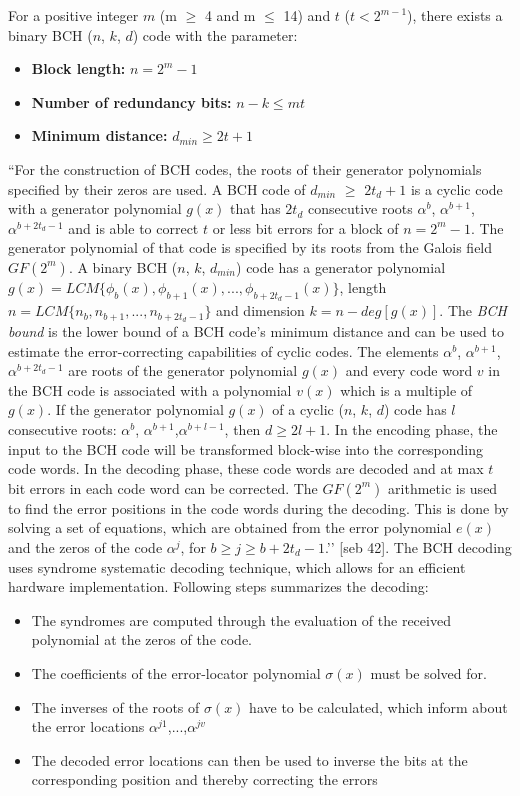 For a positive integer $m$ (m $\geq$ 4 and m $\leq$ 14) and $t$ ($t < 2^{m-1}$), there exists a binary BCH ($n$, $k$, $d$) code with the parameter:
\begin{itemize}
\item \textbf{Block length:} $n = 2^m - 1$
\item \textbf{Number of redundancy bits:} $n - k \leq mt$
\item \textbf{Minimum distance:} $d_{min} \geq 2t + 1$
\end{itemize}

``For the construction of BCH codes, the roots of their generator polynomials specified by their zeros are used. A BCH code of $d_{min}$ $\geq$ $2t_d + 1$ is a cyclic code with a generator polynomial $g(x)$ that has $2t_d$ consecutive roots $\alpha^b$, $\alpha^{b+1}$,$\alpha^{b+2t_d-1}$ and is able to correct $t$ or less bit errors for a block of $n = 2^m - 1$. The generator polynomial of that code is specified by its roots from the Galois field $GF(2^m)$. A binary BCH ($n$, $k$, $d_{min}$) code
has a generator polynomial $g(x) = LCM\{\phi_{b}(x), \phi_{b+1}(x),...,\phi_{b+2t_{d}-1}(x)\}$, length $n = LCM\{n_b,n_{b+1},...,n_{b+2t_d-1}\}$ and dimension $k = n - deg[g(x)]$. The \emph{BCH bound} is the lower bound of a BCH code’s minimum distance and can be used to estimate the error-correcting capabilities of cyclic codes. The elements $\alpha^b$, $\alpha^{b+1}$,$\alpha^{b+2t_d-1}$ are roots of the generator polynomial $g(x)$ and every code word $v$ in the BCH code is associated with a
polynomial $v(x)$ which is a multiple of $g(x)$. If the generator polynomial $g(x)$ of a cyclic ($n$, $k$, $d$) code has $l$ consecutive roots: $\alpha^b$, $\alpha^{b+1}$,$\alpha^{b+l-1}$, then $d \geq 2l +1$. In the encoding phase, the input to the BCH code will be transformed block-wise into the corresponding code words. In the decoding phase, these code words are decoded and at max $t$ bit errors in each code word can be corrected. The $GF(2^m)$ arithmetic is used to find the error positions
in the code words during the decoding. This is done by solving a set of equations, which are obtained from the error polynomial $e(x)$ and the zeros of the code $\alpha^j$, for $b \geq j \geq b + 2t_d - 1$.’’ [seb 42]. The BCH decoding uses syndrome systematic decoding technique, which allows for an efficient hardware implementation. Following steps summarizes the decoding:

\begin{itemize}
\item The syndromes are computed through the evaluation of the received polynomial at the zeros of the code.
\item The coefficients of the error-locator polynomial $\sigma(x)$ must be solved for.
\item The inverses of the roots of $\sigma(x)$ have to be calculated, which inform about the error locations $\alpha^{j1}$,...,$\alpha^{jv}$
\item The decoded error locations can then be used to inverse the bits at the corresponding position and thereby correcting the errors
\end{itemize}

